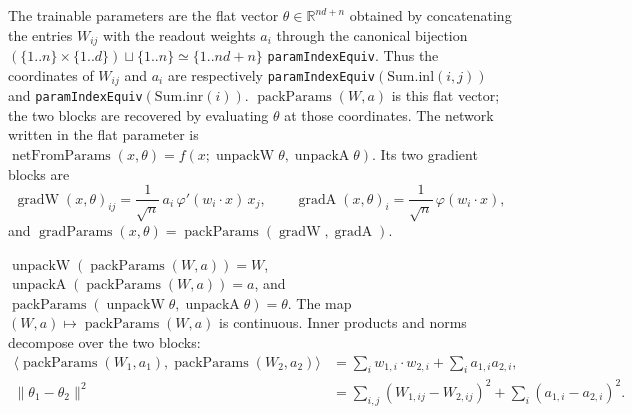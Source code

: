 \begin{definition}\label{def:ntktl:packing}
  \leanok
The trainable parameters are the flat vector $\theta\in\mathbb R^{nd+n}$ obtained by concatenating the entries $W_{ij}$ with the readout weights $a_i$ through the canonical bijection
$(\{1..n\}\times\{1..d\})\sqcup\{1..n\}\simeq\{1..nd+n\}$ \texttt{paramIndexEquiv}. Thus the coordinates of $W_{ij}$ and $a_i$ are respectively \texttt{paramIndexEquiv}$(\mathrm{Sum.inl}(i,j))$ and \texttt{paramIndexEquiv}$(\mathrm{Sum.inr}(i))$. $\operatorname{packParams}(W,a)$ is this flat vector; the two blocks are recovered by evaluating $\theta$ at those coordinates.
The network written in the flat parameter is $\operatorname{netFromParams}(x,\theta)=f(x;\operatorname{unpackW}\theta,\operatorname{unpackA}\theta)$. Its two gradient blocks are
\[
  \operatorname{gradW}(x,\theta)_{ij}=\frac1{\sqrt n}\,a_i\,\varphi'(w_i\cdot x)\,x_j,\qquad
  \operatorname{gradA}(x,\theta)_i=\frac1{\sqrt n}\,\varphi(w_i\cdot x),
\]
and $\operatorname{gradParams}(x,\theta)=\operatorname{packParams}(\operatorname{gradW},\operatorname{gradA})$.
\end{definition}

\begin{lemma}\label{lem:ntktl:packingProps}
  \leanok
$\operatorname{unpackW}(\operatorname{packParams}(W,a))=W$, $\operatorname{unpackA}(\operatorname{packParams}(W,a))=a$, and $\operatorname{packParams}(\operatorname{unpackW}\theta,\operatorname{unpackA}\theta)=\theta$. The map $(W,a)\mapsto\operatorname{packParams}(W,a)$ is continuous. Inner products and norms decompose over the two blocks:
\begin{align*}
  \langle\operatorname{packParams}(W_1,a_1),\operatorname{packParams}(W_2,a_2)\rangle&=\sum_iw_{1,i}\cdot w_{2,i}+\sum_ia_{1,i}a_{2,i},\\
  \|\theta_1-\theta_2\|^2&=\sum_{i,j}(W_{1,ij}-W_{2,ij})^2+\sum_i(a_{1,i}-a_{2,i})^2.
\end{align*}
\end{lemma}

